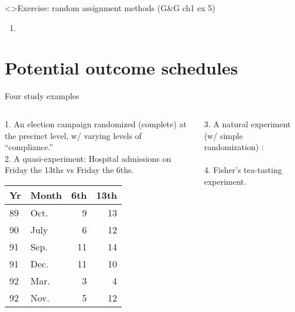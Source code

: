 \begin{frame}<\nottheirhandout>{Exercise: random assignment methods}
{\footnotesize (G\&G ch1 ex 5)}

\begin{enumerate} \addtocounter{enumi}{9}
\item 
{\small 
}
\end{enumerate}
\vfill

\end{frame}


\section{Potential outcome schedules}

\begin{frame}{Four study examples} 


\begin{columns}
\begin{Column}
1. An election campaign randomized (complete) at the precinct level, w/ varying
levels of ``compliance.''\\[2ex]
 2. A quasi-experiment: Hospital admissions on Friday the 13ths vs
Friday the 6ths.\\
{\small
\begin{tabular}{ll|rr} \hline
Yr & Month &	6th &	13th \\ \hline
89 & Oct. &	9 &	13 \\
90 & July &	6 &	12 \\
91 & Sep. &11 &	14 \\
91 & Dec. &	11 &	10 \\
92 & Mar. &	3 &	4 \\
92 & Nov. &	5 &	12 \\ \hline
\end{tabular}
}
\end{Column}
\begin{Column}

3. A natural experiment (w/ simple randomization)%
:
\\
        \\[2ex]

4. Fisher's tea-tasting experiment. 

\end{Column}
\end{columns}

  
\end{frame}

